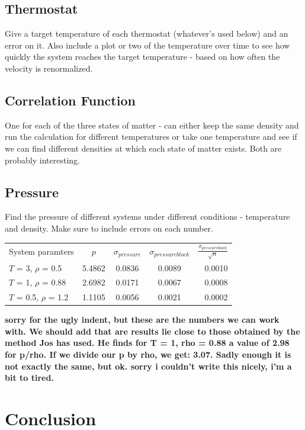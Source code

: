 \documentclass{article}
\begin{document}
\begin{multicols}{2}
\subsection{Thermostat}

Give a target temperature of each thermostat (whatever's used below) and an error on it.  Also include a plot or two of the temperature over time to see how quickly the system reaches the target temperature - based on how often the velocity is renormalized.

\subsection{Correlation Function}

One for each of the three states of matter - can either keep the same density and run the calculation for different temperatures or take one temperature and see if we can find different densities at which each state of matter exists.  Both are probably interesting.

\subsection{Pressure}

Find the pressure of different systems under different conditions - temperature and density.  Make sure to include errors on each number.

\begin{tabular}{ l | c | c | c | r }
  System paramters & $p$ & $\sigma_{pressure}$ & $\sigma_{pressureblock}$ & $\frac{\sigma_{pressureblock}}{\sqrt n}$ \\
  $T$ = 3, $\rho$ = 0.5 & 5.4862 & 0.0836 & 0.0089 & 0.0010 \\
  $T$ = 1, $\rho$ = 0.88 & 2.6982 & 0.0171 & 0.0067 & 0.0008 \\
  $T$ = 0.5, $\rho$ = 1.2 & 1.1105 & 0.0056 & 0.0021 & 0.0002 \\
\end{tabular}

\textbf{sorry for the ugly indent, but these are the numbers we can work with. We should add that are results lie close to those obtained by the method Jos has used. He finds for T = 1, rho = 0.88 a value of 2.98 for p/rho. If we divide our p by rho, we get: 3.07. Sadly enough it is not exactly the same, but ok. sorry i couldn't write this nicely, i'm a bit to tired.}

\section{Conclusion}
\label{conc}


\end{multicols}
\end{document}
